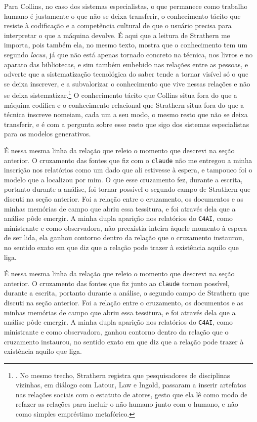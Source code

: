 Para Collins, no caso dos sistemas especialistas, o que permanece como trabalho humano é justamente o que não se deixa transferir, o conhecimento tácito que resiste à codificação e a competência cultural de que o usuário precisa para interpretar o que a máquina devolve. É aqui que a leitura de Strathern me importa, pois também ela, no mesmo texto, mostra que o conhecimento tem um segundo \textit{locus}, já que não está apenas tornado concreto na técnica, nos livros e no aparato das bibliotecas, e sim também embebido nas relações entre as pessoas, e adverte que a sistematização tecnológica do saber tende a tornar visível só o que se deixa inscrever, e a subvalorizar o conhecimento que vive nessas relações e não se deixa sistematizar.\footnote{\textcite[pp.~24--29]{strathern1995relation}. No mesmo trecho, Strathern registra que pesquisadores de disciplinas vizinhas, em diálogo com Latour, Law e Ingold, passaram a inserir artefatos nas relações sociais com o estatuto de atores, gesto que ela lê como modo de refazer as relações para incluir o não humano junto com o humano, e não como simples empréstimo metafórico.} O conhecimento tácito que Collins situa fora do que a máquina codifica e o conhecimento relacional que Strathern situa fora do que a técnica inscreve nomeiam, cada um a seu modo, o mesmo resto que não se deixa transferir, e é com a pergunta sobre esse resto que sigo dos sistemas especialistas para os modelos generativos.

É nessa mesma linha da relação que releio o momento que descrevi na seção anterior. O cruzamento das fontes que fiz com o \texttt{claude} não me entregou a minha inscrição nos relatórios como um dado que ali estivesse à espera, e tampouco foi o modelo que a localizou por mim. O que esse cruzamento fez, durante a escrita, portanto durante a análise, foi tornar possível o segundo campo de Strathern que discuti na seção anterior. Foi a relação entre o cruzamento, os documentos e as minhas memórias de campo que abriu essa tessitura, e foi através dela que a análise pôde emergir. A minha dupla aparição nos relatórios do \texttt{C4AI}, como ministrante e como observadora, não preexistia inteira àquele momento à espera de ser lida, ela ganhou contorno dentro da relação que o cruzamento instaurou, no sentido exato em que \textcite{strathern1995relation} diz que a relação pode trazer à existência aquilo que liga.

É nessa mesma linha da relação que releio o momento que descrevi na seção anterior. O cruzamento das fontes que fiz junto ao \texttt{claude} tornou possível, durante a escrita, portanto durante a análise, o segundo campo de Strathern que discuti na seção anterior. Foi a relação entre o cruzamento, os documentos e as minhas memórias de campo que abriu essa tessitura, e foi através dela que a análise pôde emergir. A minha dupla aparição nos relatórios do \texttt{C4AI}, como ministrante e como observadora, ganhou contorno dentro da relação que o cruzamento instaurou, no sentido exato em que \textcite{strathern1995relation} diz que a relação pode trazer à existência aquilo que liga.

